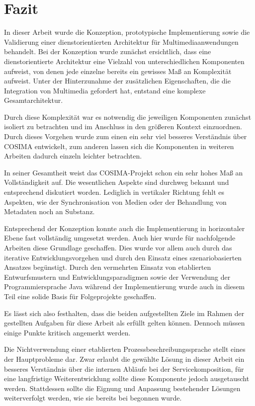 \chapter{Fazit} %
\label{cha:fazit}

  In dieser Arbeit wurde die Konzeption, prototypische Implementierung sowie die Validierung einer dienstorientierten Architektur für Multimediaanwendungen behandelt. Bei der Konzeption wurde zunächst ersichtlich, dass eine dienstorientierte Architektur eine Vielzahl von unterschiedlichen Komponenten aufweist, von denen jede einzelne bereits ein gewisses Maß an Komplexität aufweist. Unter der Hinterzunahme der zusätzlichen Eigenschaften, die die Integration von Multimedia gefordert hat, entstand eine komplexe Gesamtarchitektur.
  
  Durch diese Komplexität war es notwendig die jeweiligen Komponenten zunächst isoliert zu betrachten und im Anschluss in den größeren Kontext einzuordnen. Durch dieses Vorgehen wurde zum einen ein sehr viel besseres Verständnis über COSIMA entwickelt, zum anderen lassen sich die Komponenten in weiteren Arbeiten dadurch einzeln leichter betrachten.
  
  In seiner Gesamtheit weist das COSIMA-Projekt schon ein sehr hohes Maß an Vollständig\-keit auf. Die wesentlichen Aspekte sind durchweg bekannt und entsprechend diskutiert worden. Lediglich in vertikaler Richtung fehlt es Aspekten, wie der Synchronisation von Medien oder der Behandlung von Metadaten noch an Substanz.
  
  Entsprechend der Konzeption konnte auch die Implementierung in horizontaler Ebene fast vollständig umgesetzt werden. Auch hier wurde für nachfolgende Arbeiten diese Grundlage geschaffen. Dies wurde vor allem auch durch das iterative Entwicklungsvorgehen und durch den Einsatz eines szenariobasierten Ansatzes begünstigt. Durch den vermehrten Einsatz von etablierten Entwurfsmustern und Entwicklungsparadigmen sowie der Verwendung der Programmiersprache Java während der Implementierung wurde auch in diesem Teil eine solide Basis für Folgeprojekte geschaffen.
  
  Es lässt sich also festhalten, dass die beiden aufgestellten Ziele im Rahmen der gestellten Aufgaben für diese Arbeit als erfüllt gelten können. Dennoch müssen einige Punkte kritisch angemerkt werden.
  
  Die Nichtverwendung einer etablierten Prozessbeschreibungssprache stellt eines der Hauptprobleme dar. Zwar erlaubt die gewählte Lösung in dieser Arbeit ein besseres Verständnis über die internen Abläufe bei der Servicekomposition, für eine langfristige Weiterentwicklung sollte diese Komponente jedoch ausgetauscht werden. Stattdessen sollte die Eignung und Anpassung bestehender Lösungen weiterverfolgt werden, wie sie bereits bei \citep{samma08} begonnen wurde.
  
